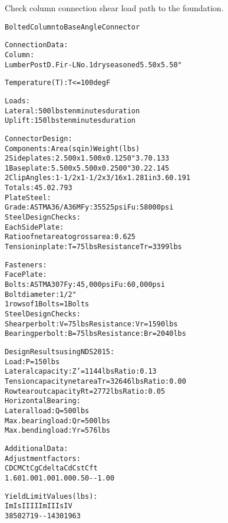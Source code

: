\documentclass[12pt,notitle,letterpaper]{report}
\renewenvironment{quote}
  {\small\list{}{\rightmargin=0cm \leftmargin=0cm}%
   \item\relax}
  {\endlist}
\begin{document}
Check column connection shear load path to the foundation.


\begin{quote}
\begin{alltt}
Bolted Column to Base Angle Connector

 Connection Data:
    Column:
       Lumber Post  D.Fir-L No.1  dry seasoned 5.50 x 5.50"

    Temperature (T) : T <= 100 deg F

    Loads:
       Lateral:     500 lbs   ten minutes duration
       Uplift:      150 lbs   ten minutes duration

 Connector Design:
    Components:                                    Area (sq in)  Weight (lbs)
       2 Side plates:  2.500 x  1.500 x  0.1250"        3.7        0.133
       1 Base plate:   5.500 x  5.500 x  0.2500"       30.2        2.145
       2 Clip Angles: 1-1/2 x 1-1/2 x 3/16 x 1.281 in   3.6        0.191
       Totals:                                         45.0        2.793
       Plate Steel:
          Grade: ASTM A36/A36M       Fy:  35525 psi    Fu:  58000 psi
       Steel Design Checks:
          Each Side Plate:
             Ratio of net area to gross area: 0.625
             Tension in plate: T =    75 lbs   Resistance Tr =  3399 lbs

    Fasteners:
       Face Plate:
          Bolts: ASTM A307     Fy: 45,000 psi     Fu: 60,000 psi
          Bolt diameter: 1/2"
          1 rows of 1 Bolts =  1 Bolts
          Steel Design Checks:
             Shear per bolt:   V =    75 lbs   Resistance:    Vr =  1590 lbs
             Bearing per bolt: B =    75 lbs   Resistance:    Br =  2040 lbs

 Design Results using NDS 2015:
    Load:                     P  =   150 lbs
    Lateral capacity:         Z' =  1144 lbs  Ratio: 0.13
    Tension capacity net area Tr = 32646 lbs  Ratio: 0.00
    Row tear out capacity     Rt =  2772 lbs  Ratio: 0.05
    Horizontal Bearing:
       Lateral load:             Q  =   500 lbs
       Max. bearing load:        Qr =   500 lbs
       Max. bending load:        Yr =   576 lbs

 Additional Data:
    Adjustment factors:
    CD     CM     Ct     Cg   Cdelta   Cd    Cst    Cft
    1.60   1.00   1.00   1.00   0.50    -      -     1.00

    Yield Limit Values (lbs):
       Im        Is        II        IIIm      IIIs      IV
       3850      2719      -          -        1430      1963
\end{alltt}
\end{quote}
\end{document}

